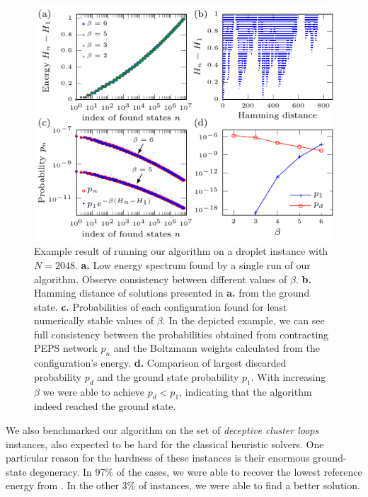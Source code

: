 \begin{figure}
  \includegraphics[width=\textwidth]{figures/tn-single-state.pdf}
  \caption{Example result of running our algorithm on a droplet instance with $N=2048$.
    \textbf{a.} Low energy spectrum found by a single run of our algorithm. Observe
    consistency between different values of $\beta$. \textbf{b.} Hamming distance
    of solutions presented in \textbf{a.} from the ground state. \textbf{c.}
    Probabilities of each configuration found for least numerically stable values
    of $\beta$. In the depicted example, we can see full consistency between the
    probabilities obtained from contracting PEPS network $p_{n}$ and the Boltzmann
    weights calculated from the configuration's energy. \textbf{d.} Comparison of
    largest discarded probability $p_{d}$ and the ground state probability $p_{1}$.
    With increasing $\beta$ we were able to achieve $p_{d} < p_{1}$, indicating
    that the algorithm indeed reached the ground state. }
  \label{fig:tn-single-state}
\end{figure}

We also benchmarked our algorithm on the set of \emph{deceptive cluster loops}
\cite{helmut_deceptive_2018} instances, also expected to be hard for the
classical heuristic solvers. One particular reason for the hardness of these
instances is their enormous ground-state degeneracy. In 97\% of the cases, we
were able to recover the lowest reference energy from
\cite{helmut_deceptive_2018}. In the other 3\% of instances, we were able to
find a better solution.

